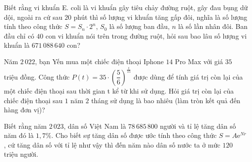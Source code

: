 \begin{ex}%
	Biết rằng vi khuẩn E. coli là vi khuẩn gây tiêu chảy  đường ruột, gây đau bụng dữ dội, ngoài ra cứ sau $20$ phút thì số lượng vi khuẩn tăng gấp đôi, nghĩa là số lượng tính theo công thức $S=S_n\cdot 2^n$, $S_0$ là số lượng ban đầu, $n$ là số lần nhân đôi. Ban đầu chỉ có $40$ con vi khuẩn nói trên trong đường ruột, hỏi sau bao lâu số lượng vi khuẩn là $671\,088\,640$ con?
\end{ex}

\begin{ex}%
	Năm $2\,022$, bạn Yến mua một chiếc điện thoại Iphone $14$ Pro Max với giá $35$ triệu đồng. Công thức $P(t)=35\cdot \left(\dfrac{5}{6}\right)^{\tfrac{t}{15}}$ được dùng để tính giá trị còn lại của một chiếc điện thoại sau thời gian t kể từ khi sử dụng. Hỏi giá trị còn lại của chiếc điện thoại  sau $1$ năm $2$ tháng sử dụng là bao nhiêu (làm tròn kết quả đến hàng đơn vị)?
\end{ex}

\begin{ex}%
	Biết rằng năm  $2\,023$, dân số Việt Nam là $78\,685\,800$ người và tỉ lệ tăng dân số năm đó là $1{,}7\%$. Cho biết sự tăng dân số được ước tính theo công thức $S=A\mathrm{e}^{Nr}$, cứ tăng dân số với tỉ lệ như vậy thì đến năm nào dân số nước ta ở mức $120$ triệu người.
\end{ex}

